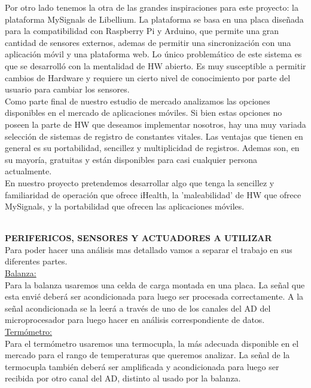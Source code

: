 \documentclass[11pt]{report}
\begin{document}
Por otro lado tenemos la otra de las grandes inspiraciones para este proyecto: la plataforma MySignals de Libellium. La plataforma se basa en una placa diseñada para la compatibilidad con Raspberry Pi y Arduino, que permite una gran cantidad de sensores externos, ademas de permitir una sincronización con una aplicación móvil y una plataforma
web. Lo único problemático de este sistema es que se desarrolló con la mentalidad de HW abierto. Es muy susceptible a permitir cambios de Hardware y requiere un cierto nivel de conocimiento por parte del usuario para cambiar los sensores.\\

Como parte final de nuestro estudio de mercado analizamos las opciones disponibles en el mercado de aplicaciones móviles. Si bien estas opciones no poseen la parte de HW que deseamos implementar nosotros, hay una muy variada selección de sistemas de registro de constantes vitales. Las ventajas que tienen en general es su portabilidad, sencillez
y multiplicidad de registros. Ademas son, en su mayoría, gratuitas y están disponibles para casi cualquier persona actualmente.\\

En nuestro proyecto pretendemos desarrollar algo que tenga la sencillez y familiaridad de operación que ofrece iHealth, la 'maleabilidad' de HW que ofrece MySignals, y la portabilidad que ofrecen las aplicaciones móviles.\\

\hfill
\\ \hfill

\noindent \large \textbf{PERIFERICOS, SENSORES Y ACTUADORES A UTILIZAR} \\

Para poder hacer una análisis mas detallado vamos a separar el trabajo en sus diferentes partes.\\

\noindent \underline{Balanza: }\\
Para la balanza usaremos una celda de carga montada en una placa. La señal que esta envié deberá ser acondicionada para luego ser procesada correctamente. A la señal acondicionada se la leerá a través de uno de los canales del AD del
microprocesador para luego hacer en análisis correspondiente de datos.\\

\noindent \underline{Termómetro:}\\
Para el termómetro usaremos una termocupla, la más adecuada disponible en el mercado para el rango de temperaturas que queremos analizar. La señal de la termocupla también deberá ser amplificada y acondicionada para
luego ser recibida por  otro canal del AD, distinto al usado por la balanza.\\
\end{document}
